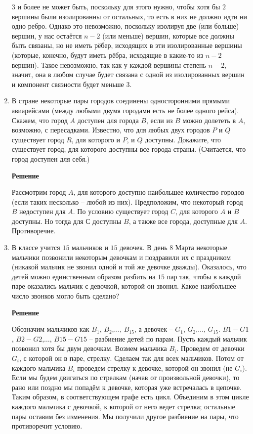 \documentclass[12pt]{article}
\begin{document}
\begin{enumerate}[label={\textbf{\arabic{section}.\arabic*}}]
		$3$ и более не может быть, поскольку для этого нужно, чтобы хотя бы $2$ вершины были изолированны от остальных, то есть в них не должно идти ни одно ребро. Однако это невозможно, поскольку изолируя две (или больше) вершин, у нас остаётся $n-2$ (или меньше) вершин, которые все должны быть связаны, но не иметь рёбер, исходящих в эти изолированные вершины (которые, конечно, будут иметь рёбра, исходящие в какие-то из $n-2$ вершин). Такое невозможно, так как у каждой вершины степень $n-2$, значит, она в любом случае будет связана с одной из изолированных вершин и компонент связности будет меньше $3$.
		
		\item В стране некоторые пары городов соединены односторонними прямыми авиарейсами (между любыми двумя городами есть не более одного рейса). Скажем, что город $A$ доступен для города $B$, если из $B$ можно долететь в $A$, возможно, с пересадками. Известно, что для любых двух городов $P$ и $Q$ существует город $R$, для которого и $P$, и $Q$ доступны. Докажите, что существует город, для которого доступны все города страны. (Считается, что город доступен для себя.)
		
		\textbf{Решение}
		
		Рассмотрим город $A$, для которого доступно наибольшее количество городов (если таких несколько -- любой из них). Предположим, что некоторый город $B$ недоступен для $A$. По условию существует город $C$, для которого $A$ и $B$ доступны. Но тогда для $С$ доступны $B$, а также все города, доступные для $A$. Противоречие.
		
		\item В классе учится $15$ мальчиков и $15$ девочек. В день $8$ Марта некоторые мальчики позвонили некоторым девочкам и поздравили их с праздником (никакой мальчик не звонил одной и той же девочке дважды). Оказалось, что детей можно единственным образом разбить на $15$ пар так, чтобы в каждой паре оказались мальчик с девочкой, которой он звонил. Какое наибольшее число звонков могло быть сделано?
		
		\textbf{Решение}
		
		Обозначим мальчиков как $B_1$, $B_2$,$\dots$, $B_{15}$, а девочек -- $G_1$, $G_2$,$\dots$, $G_{15}$. $B1-G1$, $B2-G2$,$\dots$, $B15-G15$ -- разбиение детей по парам. Пусть каждый мальчик позвонил хотя бы двум девочкам. 
		Возмем мальчика $B_i$. Проведем от девочки $G_i$, с которой он в паре, стрелку. Сделаем так для всех мальчиков. Потом от каждого мальчика $B_i$ проведем стрелку к девочке, которой он звонил (не $G_i$). Если мы будем двигаться по стрелкам (начав от произвольной девочки), то рано или поздно мы попадём к девочке, которая уже встречалась в цепочке. Таким образом, в соответствующем графе есть цикл. Объединим в этом цикле каждого мальчика с девочкой, к которой от него ведет стрелка; остальные пары оставим без изменения. Мы получили другое разбиение на пары, что противоречит условию.
		

\end{enumerate}
\end{document}
